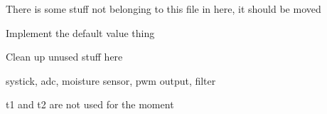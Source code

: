
\begin{DoxyRefList}
\item[\label{todo__todo000001}%
\hypertarget{todo__todo000001}{}%
File \hyperlink{hw_8h}{hw.h} ]There is some stuff not belonging to this file in here, it should be moved 
\item[\label{todo__todo000002}%
\hypertarget{todo__todo000002}{}%
global\+Scope$>$ Member \hyperlink{hw_8h_a3c02952100e7d051b77cdf060ca0ba9ba45012c00c17031e71a4f60ada04df07d}{H\+W\+\_\+\+I\+N\+I\+T\+\_\+\+P\+R\+E\+\_\+\+N\+V\+I\+C} ]Implement the default value thing  
\item[\label{todo__todo000004}%
\hypertarget{todo__todo000004}{}%
Member \hyperlink{structirrigation__controller__status_ab795e232c4e2d405b11e24312a6163c3}{irrigation\+\_\+controller\+\_\+status\+:\+:last\+\_\+hot\+\_\+sample} ]Clean up unused stuff here  
\item[\label{todo__todo000005}%
\hypertarget{todo__todo000005}{}%
File \hyperlink{main_8c}{main.c} ]systick, adc, moisture sensor, pwm output, filter 
\item[\label{todo__todo000003}%
\hypertarget{todo__todo000003}{}%
global\+Scope$>$ Member \hyperlink{irrigation_8h_a9891f6b3b37611d2aebdb8601acdf6c6a4460d045ceb966a377b72d2825606fbd}{moisture\+\_\+sensor\+\_\+t1} ]t1 and t2 are not used for the moment 
\end{DoxyRefList}